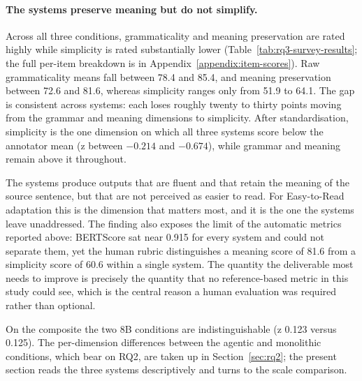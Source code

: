 \paragraph{The systems preserve meaning but do not simplify.} Across all three conditions, grammaticality and meaning preservation are rated highly while simplicity is rated substantially lower (Table~\ref{tab:rq3-survey-results}; the full per-item breakdown is in Appendix~\ref{appendix:item-scores}). Raw grammaticality means fall between 78.4 and 85.4, and meaning preservation between 72.6 and 81.6, whereas simplicity ranges only from 51.9 to 64.1. The gap is consistent across systems: each loses roughly twenty to thirty points moving from the grammar and meaning dimensions to simplicity. After standardisation, simplicity is the one dimension on which all three systems score below the annotator mean (z between $-0.214$ and $-0.674$), while grammar and meaning remain above it throughout.

The systems produce outputs that are fluent and that retain the meaning of the source sentence, but that are not perceived as easier to read. For Easy-to-Read adaptation this is the dimension that matters most, and it is the one the systems leave unaddressed. The finding also exposes the limit of the automatic metrics reported above: BERTScore sat near 0.915 for every system and could not separate them, yet the human rubric distinguishes a meaning score of 81.6 from a simplicity score of 60.6 within a single system. The quantity the deliverable most needs to improve is precisely the quantity that no reference-based metric in this study could see, which is the central reason a human evaluation was required rather than optional.

On the composite the two 8B conditions are indistinguishable (z 0.123 versus 0.125). The per-dimension differences between the agentic and monolithic conditions, which bear on RQ2, are taken up in Section~\ref{sec:rq2}; the present section reads the three systems descriptively and turns to the scale comparison.

